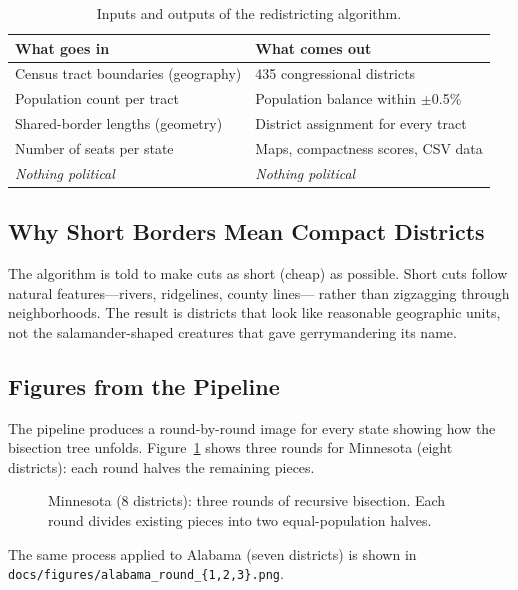 \begin{table}[h]
\centering
\caption{Inputs and outputs of the redistricting algorithm.}
\label{tab:inout}
\begin{tabular}{@{}p{} p{}@{}}
\toprule
\textbf{What goes in} & \textbf{What comes out} \\
\midrule
Census tract boundaries (geography) &
  435 congressional districts \\
Population count per tract &
  Population balance within $\pm$0.5\% \\
Shared-border lengths (geometry) &
  District assignment for every tract \\
Number of seats per state &
  Maps, compactness scores, CSV data \\
\midrule
\emph{Nothing political} &
  \emph{Nothing political} \\
\bottomrule
\end{tabular}
\end{table}

\subsection*{Why Short Borders Mean Compact Districts}

The algorithm is told to make cuts as short (cheap) as possible.
Short cuts follow natural features---rivers, ridgelines, county lines---
rather than zigzagging through neighborhoods.
The result is districts that look like reasonable geographic units,
not the salamander-shaped creatures that gave gerrymandering its name.

\subsection*{Figures from the Pipeline}

The pipeline produces a round-by-round image for every state showing
how the bisection tree unfolds.
Figure~\ref{fig:mn} shows three rounds for Minnesota (eight districts):
each round halves the remaining pieces.

\begin{figure}[h]
\centering
{}
\caption{Minnesota (8 districts): three rounds of recursive bisection.
Each round divides existing pieces into two equal-population halves.}
\label{fig:mn}
\end{figure}

\noindent The same process applied to Alabama (seven districts) is shown in
\texttt{docs/figures/alabama\_round\_\{1,2,3\}.png}.
